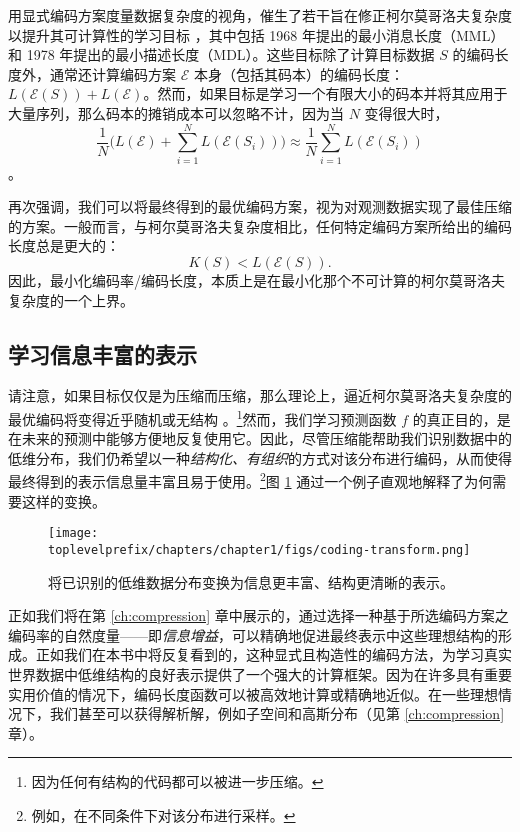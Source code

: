 \documentclass[../../book-main.tex]{subfiles}
\begin{document}
\begin{remark}\label{rem:computable-complexity}
    {用显式编码方案度量数据复杂度的视角，催生了若干旨在修正柯尔莫哥洛夫复杂度以提升其可计算性的学习目标 \cite{WallaceC1999}，其中包括 1968 年提出的最小消息长度（MML）\cite{WallaceC1968} 和 1978 年提出的最小描述长度（MDL）\cite{Rissanen-1978,HansenM2001}。这些目标除了计算目标数据 $S$ 的编码长度外，通常还计算编码方案 $\mathcal{E}$ 本身（包括其码本）的编码长度：$L(\mathcal E(S)) + L(\mathcal E)$。然而，如果目标是学习一个有限大小的码本并将其应用于大量序列，那么码本的摊销成本可以忽略不计，因为当 $N$ 变得很大时，$$\frac{1}{N}\Big( L(\mathcal{E}) + \sum_{i=1}^N L(\mathcal{E}(S_i))\Big) \approx \frac{1}{N}\sum_{i=1}^N L(\mathcal{E}(S_i))$$。}
\end{remark}

再次强调，我们可以将最终得到的最优编码方案，视为对观测数据实现了最佳压缩的方案。一般而言，与柯尔莫哥洛夫复杂度相比，任何特定编码方案所给出的编码长度总是更大的：
\begin{equation}
    K(S) < L( \mathcal E(S)).
\end{equation} 
因此，最小化编码率/编码长度，本质上是在最小化那个不可计算的柯尔莫哥洛夫复杂度的一个上界。

\subsection{学习信息丰富的表示}

请注意，如果目标仅仅是为压缩而压缩，那么理论上，逼近柯尔莫哥洛夫复杂度的最优编码将变得近乎随机或无结构 \cite{Chaitin-1966}。\footnote{因为任何有结构的代码都可以被进一步压缩。}然而，我们学习预测函数 $f$ 的真正目的，是在未来的预测中能够方便地反复使用它。因此，尽管压缩能帮助我们识别数据中的低维分布，我们仍希望以一种{\em 结构化、有组织}的方式对该分布进行编码，从而使得最终得到的表示信息量丰富且易于使用。\footnote{例如，在不同条件下对该分布进行采样。}图 \ref{fig:expansion} 通过一个例子直观地解释了为何需要这样的变换。

\begin{figure}
    \centering
    \texttt{[image: \\toplevelprefix/chapters/chapter1/figs/coding-transform.png]}
    \caption{将已识别的低维数据分布变换为信息更丰富、结构更清晰的表示。}
    \label{fig:expansion}
\end{figure}
正如我们将在第 \ref{ch:compression} 章中展示的，通过选择一种基于所选编码方案之编码率的自然度量——即{\em 信息增益}，可以精确地促进最终表示中这些理想结构的形成。正如我们在本书中将反复看到的，这种显式且构造性的编码方法，为学习真实世界数据中低维结构的良好表示提供了一个强大的计算框架。因为在许多具有重要实用价值的情况下，编码长度函数可以被高效地计算或精确地近似。在一些理想情况下，我们甚至可以获得解析解，例如子空间和高斯分布（见第 \ref{ch:compression} 章）。
\end{document}
